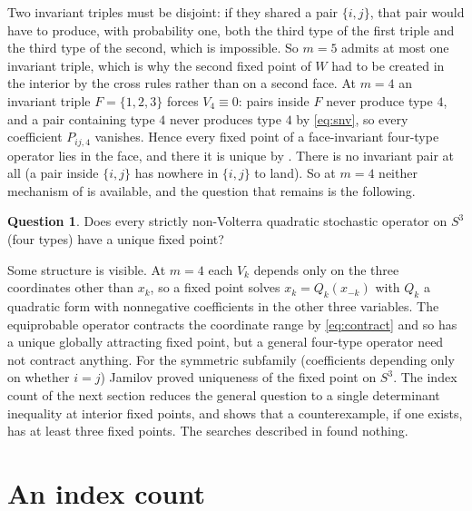 \documentclass[11pt]{amsart}
\theoremstyle{definition}
\newtheorem{question}[theorem]{Question}
\begin{document}
Two invariant triples must be disjoint: if they shared a pair $\{i,j\}$, that pair would have to produce, with probability one, both the third type of the first triple and the third type of the second, which is impossible. So $m=5$ admits at most one invariant triple, which is why the second fixed point of $W$ had to be created in the interior by the cross rules rather than on a second face. At $m=4$ an invariant triple $F=\{1,2,3\}$ forces $V_4\equiv0$: pairs inside $F$ never produce type $4$, and a pair containing type $4$ never produces type $4$ by \eqref{eq:snv}, so every coefficient $P_{ij,4}$ vanishes. Hence every fixed point of a face-invariant four-type operator lies in the face, and there it is unique by . There is no invariant pair at all (a pair inside $\{i,j\}$ has nowhere in $\{i,j\}$ to land). So at $m=4$ neither mechanism of  is available, and the question that remains is the following.

\begin{question}\label{q:four}
Does every strictly non-Volterra quadratic stochastic operator on $S^3$ (four types) have a unique fixed point?
\end{question}

Some structure is visible. At $m=4$ each $V_k$ depends only on the three coordinates other than $x_k$, so a fixed point solves $x_k=Q_k(x_{-k})$ with $Q_k$ a quadratic form with nonnegative coefficients in the other three variables. The equiprobable operator contracts the coordinate range by \eqref{eq:contract} and so has a unique globally attracting fixed point, but a general four-type operator need not contract anything. For the symmetric subfamily (coefficients depending only on whether $i=j$) Jamilov \cite{Jam16} proved uniqueness of the fixed point on $S^3$. The index count of the next section reduces the general question to a single determinant inequality at interior fixed points, and shows that a counterexample, if one exists, has at least three fixed points. The searches described in  found nothing.

\section{An index count}\label{sec:index}
\end{document}
